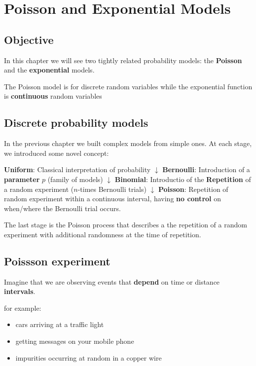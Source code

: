 \documentclass[
]{book}
\providecommand{\tightlist}{%
  \setlength{\itemsep}{0pt}\setlength{\parskip}{0pt}}
\begin{document}
\hypertarget{poisson-and-exponential-models}{%
\chapter{Poisson and Exponential Models}\label{poisson-and-exponential-models}}

\hypertarget{objective-4}{%
\section{Objective}\label{objective-4}}

In this chapter we will see two tightly related probability models: the \textbf{Poisson} and the \textbf{exponential} models.

The Poisson model is for discrete random variables while the exponential function is \textbf{continuous} random variables

\hypertarget{discrete-probability-models-1}{%
\section{Discrete probability models}\label{discrete-probability-models-1}}

In the previous chapter we built complex models from simple ones. At each stage, we introduced some novel concept:

\textbf{Uniform}: Classical interpretation of probability
\(\downarrow\)
\textbf{Bernoulli}: Introduction of a \textbf{parameter} \(p\) (family of models)
\(\downarrow\)
\textbf{Binomial}: Introductio of the \textbf{Repetition} of a random experiment (\(n\)-times Bernoulli trials)
\(\downarrow\)
\textbf{Poisson}: Repetition of random experiment within a continuous interval, having \textbf{no control} on when/where the Bernoulli trial occurs.

The last stage is the Poisson process that describes a the repetition of a random experiment with additional randomness at the time of repetition.

\hypertarget{poissson-experiment}{%
\section{Poissson experiment}\label{poissson-experiment}}

Imagine that we are observing events that \textbf{depend} on time or distance \textbf{intervals}.

for example:

\begin{itemize}
\tightlist
\item
  cars arriving at a traffic light
\item
  getting messages on your mobile phone
\item
  impurities occurring at random in a copper wire
\end{itemize}
\end{document}
